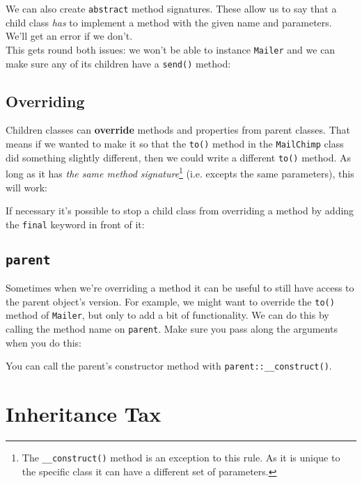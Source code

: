 We can also create \texttt{abstract} method signatures. These allow us to say that a child class \textit{has} to implement a method with the given name and parameters. We'll get an error if we don't.
\\

This gets round both issues: we won't be able to instance \texttt{Mailer} and we can make sure any of its children have a \texttt{send()} method:



\subsection{Overriding}

Children classes can \textbf{override} methods and properties from parent classes. That means if we wanted to make it so that the \texttt{to()} method in the \texttt{MailChimp} class did something slightly different, then we could write a different \texttt{to()} method. As long as it has \textit{the same method signature}\footnote{The \texttt{\_\_construct()} method is an exception to this rule. As it is unique to the specific class it can have a different set of parameters.} (i.e. excepts the same parameters), this will work:


If necessary it's possible to stop a child class from overriding a method by adding the \texttt{final} keyword in front of it:


\subsection{\texttt{parent}}

Sometimes when we're overriding a method it can be useful to still have access to the parent object's version. For example, we might want to override the \texttt{to()} method of \texttt{Mailer}, but only to add a bit of functionality. We can do this by calling the method name on \texttt{parent}. Make sure you pass along the arguments when you do this:


You can call the parent's constructor method with \texttt{parent::\_\_construct()}.



\section{Inheritance Tax}

